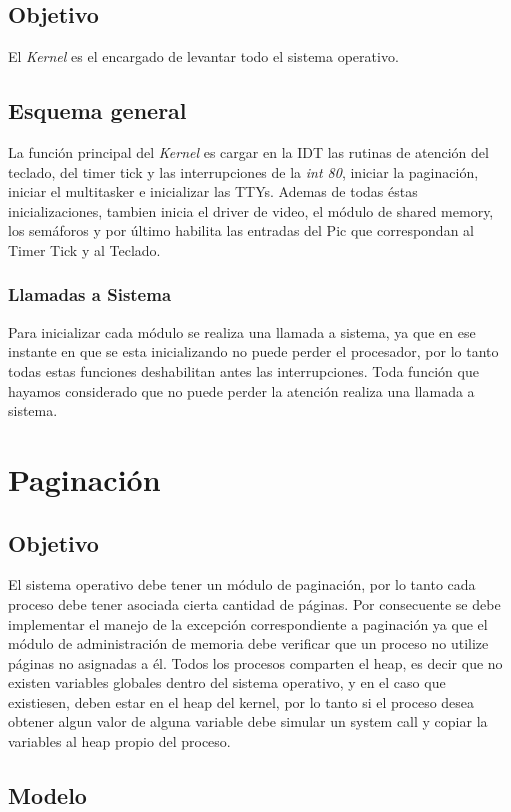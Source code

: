 \documentclass[10pt,a4paper]{article}
\begin{document}
	\subsection{Objetivo}
		El \textit{Kernel} es el encargado de levantar todo el sistema operativo.
	\subsection{Esquema general}
		La funci\'on principal del \textit{Kernel} es cargar en la IDT las rutinas de atenci\'on del teclado, del timer tick y las interrupciones de la \textit{int 80}, iniciar la paginaci\'on, iniciar el multitasker e inicializar las TTYs. Ademas de todas \'estas inicializaciones, tambien inicia el driver de video, el m\'odulo de shared memory, los sem\'aforos y por \'ultimo habilita las entradas del Pic que correspondan al Timer Tick y al Teclado. 
	\subsubsection{Llamadas a Sistema}
		Para inicializar cada m\'odulo se realiza una llamada a sistema, ya que en ese instante en que se esta inicializando no puede perder el procesador, por lo tanto todas estas funciones deshabilitan antes las interrupciones. Toda funci\'on que hayamos considerado que no puede perder la atenci\'on realiza una llamada a sistema.

\section{Paginaci\'on}
	\subsection{Objetivo}
		El sistema operativo debe tener un m\'odulo de paginaci\'on, por lo tanto cada proceso debe tener asociada cierta cantidad de p\'aginas. Por consecuente se debe implementar el manejo de la excepci\'on correspondiente a paginaci\'on ya que el m\'odulo de administraci\'on de memoria debe verificar que un proceso no utilize p\'aginas no asignadas a \'el. Todos los procesos comparten el heap, es decir que no existen variables globales dentro del sistema operativo, y en el caso que existiesen, deben estar en el heap del kernel, por lo tanto si el proceso desea obtener algun valor de alguna variable debe simular un system call y copiar la variables al heap propio del proceso.
	\subsection{Modelo}
\end{document}
